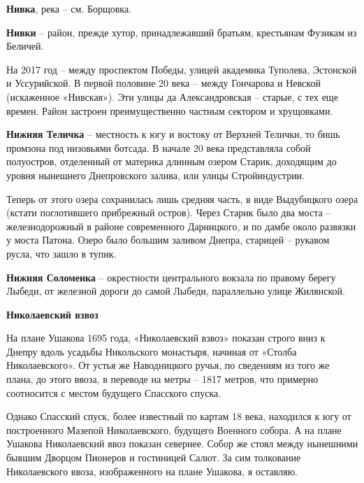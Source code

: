 \medskip

\textbf{Нивка}, река – см. Борщовка.\\


\medskip

\textbf{Нивки} – район, прежде хутор, принадлежавший братьям, крестьянам Фузикам из Беличей. 

На 2017 год – между проспектом Победы, улицей академика Туполева, Эстонской и Уссурийской. В первой половине 20 века – между Гончарова и Невской (искаженное «Нивская»). Эти улицы да Александровская – старые, с тех еще времен. Район застроен преимущественно частным сектором и хрущовками.\\

\medskip


\textbf{Нижняя Теличка} – местность к югу и востоку от Верхней Телички, то бишь промзона под низовьями ботсада. В начале 20 века представляла собой полуостров, отделенный от материка длинным озером Старик, доходящим до уровня нынешнего Днепровского залива, или улицы Стройиндустрии. 

Теперь от этого озера сохранилась лишь средняя часть, в виде Выдубицкого озера (кстати поглотившего прибрежный остров). Через Старик было два моста – железнодорожный в районе современного Дарницкого, и по дамбе около развязки у моста Патона. Озеро было большим заливом Днепра, старицей – рукавом русла, что зашло в тупик.\\


\medskip

\textbf{Нижняя Соломенка} – окрестности центра\-льного вокзала по правому берегу Лыбеди, от железной дороги до самой Лыбеди, параллельно улице Жилянской.\\


\medskip

\textbf{Николаевский взвоз}

На плане Ушакова 1695 года, «Николаевский взвоз» показан строго вниз к Днепру вдоль усадьбы Никольского монастыря, начиная от «Столба Николаевского». От устья же Наводницкого ручья, по сведениям из того же плана, до этого ввоза, в переводе на метры – 1817 метров, что примерно соотносится с местом будущего Спасского спуска. 

Однако Спасский спуск, более известный по картам 18 века, находился к югу от построенного Мазепой Николаевского, будущего Военного собора. А на плане Ушакова Николаевский ввоз показан севернее. Собор же стоял между нынешними бывшим Дворцом Пионеров и гостиницей Салют. За сим толкование Николаевского ввоза, изображенного на плане Ушакова, я оставляю. \\


